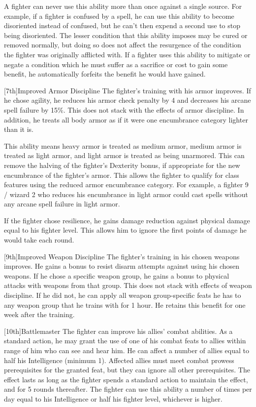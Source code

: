 \par A fighter can never use this ability more than once against a single source.
For example, if a fighter is confused by a  spell, he can use this ability to become disoriented instead of confused, but he can't then expend a second use to stop being disoriented.
The lesser condition that this ability imposes may be cured or removed normally, but doing so does not affect the resurgence of the condition the fighter was originally afflicted with.
If a fighter uses this ability to mitigate or negate a condition which he must suffer as a sacrifice or cost to gain some benefit, he automatically forfeits the benefit he would have gained.

[7th]{Improved Armor Discipline}
The fighter's training with his armor improves.
If he chose agility, he reduces his armor check penalty by 4 and decreases his arcane spell failure by 15\%.
This does not stack with the effects of armor discipline.
In addition, he treats all body armor as if it were one encumbrance category lighter than it is.
\par This ability means heavy armor is treated as medium armor, medium armor is treated as light armor, and light armor is treated as being unarmored.
This can remove the halving of the fighter's Dexterity bonus, if appropriate for the new encumbrance of the fighter's armor.
This allows the fighter to qualify for class features using the reduced armor encumbrance category.
For example, a fighter 9 / wizard 2 who reduces his encumbrance in light armor could cast spells without any arcane spell failure in light armor.

If the fighter chose resilience, he gains damage reduction against physical damage equal to his fighter level. This allows him to ignore the first points of damage he would take each round.

[9th]{Improved Weapon Discipline}
The fighter's training in his chosen weapons improves.
He gains a  bonus to resist disarm attempts against using his chosen weapons.
If he chose a specific weapon group, he gains a  bonus to physical attacks with weapons from that group.
This does not stack with effects of weapon discipline.
If he did not, he can apply all weapon group-specific feats he has to any weapon group that he trains with for 1 hour.
He retains this benefit for one week after the training.

[10th]{Battlemaster}
The fighter can improve his allies' combat abilities.
As a standard action, he may grant the use of one of his combat feats to allies within \rngmed range of him who can see and hear him.
He can affect a number of allies equal to half his Intelligence (minimum 1).
Affected allies must meet combat prowess prerequisites for the granted feat, but they can ignore all other prerequisites.
The effect lasts as long as the fighter spends a standard action to maintain the effect, and for 5 rounds thereafter.
The fighter can use this ability a number of times per day equal to his Intelligence or half his fighter level, whichever is higher.

